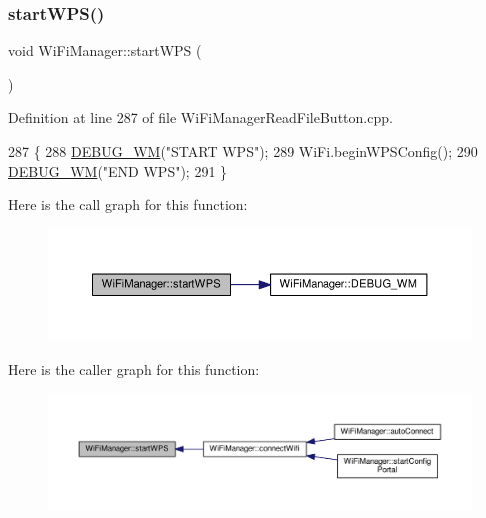 \mbox{\label{class_wi_fi_manager_abcc403fc26a47f7a111d1271f1d0869e}} 
\subsubsection{\texorpdfstring{start\+W\+P\+S()}{startWPS()}}
{\footnotesize\ttfamily void Wi\+Fi\+Manager\+::start\+W\+PS (\begin{DoxyParamCaption}{ }\end{DoxyParamCaption})\hspace{0.3cm}{\ttfamily [private]}}



Definition at line 287 of file Wi\+Fi\+Manager\+Read\+File\+Button.\+cpp.


\begin{DoxyCode}
287                            \{
288   \hyperlink{class_wi_fi_manager_ae5f595c670ccbcf9a191baf50f5c7c26}{DEBUG\_WM}(\textcolor{stringliteral}{"START WPS"});
289   WiFi.beginWPSConfig();
290   \hyperlink{class_wi_fi_manager_ae5f595c670ccbcf9a191baf50f5c7c26}{DEBUG\_WM}(\textcolor{stringliteral}{"END WPS"});
291 \}
\end{DoxyCode}
Here is the call graph for this function\+:
\nopagebreak
\begin{figure}[H]
\begin{center}
\leavevmode
\includegraphics[width=350pt]{d4/dc8/class_wi_fi_manager_abcc403fc26a47f7a111d1271f1d0869e_cgraph}
\end{center}
\end{figure}
Here is the caller graph for this function\+:
\nopagebreak
\begin{figure}[H]
\begin{center}
\leavevmode
\includegraphics[width=350pt]{d4/dc8/class_wi_fi_manager_abcc403fc26a47f7a111d1271f1d0869e_icgraph}
\end{center}
\end{figure}
\mbox{\label{class_wi_fi_manager_a8dfd64cefecbdf26242b16eca335c20b}} 
